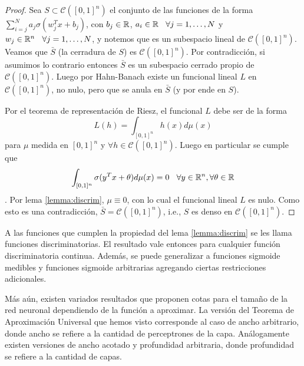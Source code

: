 \begin{proof}
\gris
Sea $S\subset\mathcal{C}([0,1]^n)$ el conjunto de las funciones de la forma $\displaystyle \sum^N_{i=j}a_j\sigma(w^T_jx+b_j)$, con  $b_j\in\mathbb{R}$, $a_i\in\mathbb{R}\hspace{.25cm}\, \forall j=1,\dots,N$ y $w_j\in\mathbb{R}^n\hspace{.25cm}\,\forall j=1,\dots,N$, y notemos que es un subespacio lineal de $\mathcal{C}([0,1]^n)$. Veamos que $\bar S$ (la cerradura de $S$) es $\mathcal{C}([0,1]^n)$. Por contradicción, si asumimos lo contrario entonces $\bar S$ es un subespacio cerrado propio de $\mathcal{C}([0,1]^n)$. Luego por Hahn-Banach existe un funcional lineal $L$ en $\mathcal{C}([0,1]^n)$, no nulo, pero que se anula en $\bar S$ (y por ende en $S$).

\newp Por el teorema de representación de Riesz, el funcional $L$ debe ser de la forma
$$ L(h) = \displaystyle\int_{[0,1]^n}h(x)d\mu(x)$$
para $\mu$ medida en $[0,1]^n$ y $\forall h\in \mathcal{C}([0,1]^n)$. Luego en particular se cumple que
$$\int_{[0,1]^n}\sigma(y^Tx+\theta)d\mu(x)=0 \hspace{.25cm}\, \forall y\in\mathbb{R}^n,\forall\theta \in\mathbb{R}$$. Por lema \ref{lemma:discrim}, $\mu\equiv 0$, con lo cual el funcional lineal $L$ es nulo. Como esto es una contradicción, $\bar S = \mathcal{C}([0,1]^n)$, i.e., $S$ es denso en $\mathcal{C}([0,1]^n)$.\findem
\negro
\end{proof}
\begin{remark}
A las funciones que cumplen la propiedad del lema \ref{lemma:discrim} se les llama funciones discriminatorias. El resultado vale entonces para cualquier función discriminatoria continua. Además, se puede generalizar a funciones sigmoide medibles y funciones sigmoide arbitrarias agregando ciertas restricciones adicionales.

Más aún, existen variados resultados que proponen cotas para el tamaño de la red neuronal dependiendo de la función a aproximar. La versión del Teorema de Aproximación Universal que hemos visto corresponde al caso de ancho arbitrario, donde ancho se refiere a la cantidad de perceptrones de la capa. Análogamente existen versiones de ancho acotado y profundidad arbitraria, donde profundidad se refiere a la cantidad de capas.
\end{remark}

